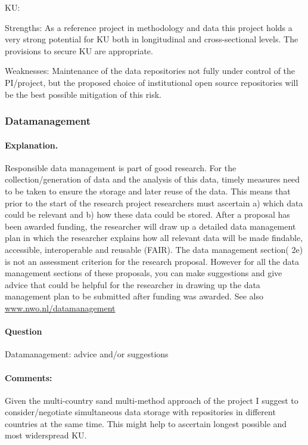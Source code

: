 \documentclass[twocolumn, serif, rga, numeric]{jote-article}
\begin{document}
\noindent KU:

Strengths: As a reference project in methodology and data this project holds a very strong potential for KU both in longitudinal and cross-sectional levels. The provisions to secure KU are appropriate.

Weaknesses: Maintenance of the data repositories not fully under control of the PI/project, but the proposed choice of institutional open source repositories will be the best possible mitigation of this risk.
 {}\subsubsection*{Datamanagement} 
\paragraph{Explanation.}
Responsible data management is part of good research. For the collection/generation of data and the analysis of this data, timely measures need to be taken to ensure the storage and later reuse of the data. This means that prior to the start of the research project researchers must ascertain a) which data could be relevant and b) how these data could be stored. After a proposal has been awarded funding, the researcher will draw up a detailed data management plan in which the researcher explains how all relevant data will be made findable, accessible, interoperable and reusable (FAIR). The data management section( 2e) is not an assessment criterion for the research proposal. However for all the data management sections of these proposals, you can make suggestions and give advice that could be helpful for the researcher in drawing up the data management plan to be submitted after funding was awarded. See also \href{www.nwo.nl/datamanagement}{www.nwo.nl/datamanagement}
\paragraph{Question}
Datamanagement: advice and/or suggestions
\paragraph{Comments:}
Given the multi-country sand multi-method approach of the project I suggest to consider/negotiate simultaneous data storage with repositories in different countries at the same time. This might help to ascertain longest possible and most widerspread KU.
\end{document}
